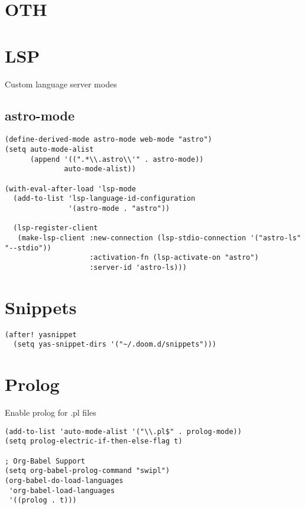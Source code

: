 \documentclass[11pt]{article}
\begin{document}
\section{OTH}
\label{sec:org20ad064}

\section{LSP}
\label{sec:orgd9ff9aa}

Custom language server modes
\subsection{astro-mode}
\label{sec:orgadf500b}
\begin{verbatim}
(define-derived-mode astro-mode web-mode "astro")
(setq auto-mode-alist
      (append '((".*\\.astro\\'" . astro-mode))
              auto-mode-alist))

(with-eval-after-load 'lsp-mode
  (add-to-list 'lsp-language-id-configuration
               '(astro-mode . "astro"))

  (lsp-register-client
   (make-lsp-client :new-connection (lsp-stdio-connection '("astro-ls" "--stdio"))
                    :activation-fn (lsp-activate-on "astro")
                    :server-id 'astro-ls)))
\end{verbatim}
\section{Snippets}
\label{sec:org2b6d2a7}

\begin{verbatim}
(after! yasnippet
  (setq yas-snippet-dirs '("~/.doom.d/snippets")))
\end{verbatim}
\section{Prolog}
\label{sec:orgb3f40fd}

Enable prolog for .pl files

\begin{verbatim}
(add-to-list 'auto-mode-alist '("\\.pl$" . prolog-mode))
(setq prolog-electric-if-then-else-flag t)

; Org-Babel Support
(setq org-babel-prolog-command "swipl")
(org-babel-do-load-languages
 'org-babel-load-languages
 '((prolog . t)))
\end{verbatim}
\end{document}
